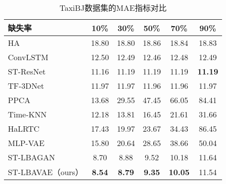\begin{table}[htbp] 
\caption{TaxiBJ数据集的MAE指标对比} \label{mae_taxibj}
\vspace{0.5em}\centering\wuhao
\begin{tabular*}{\hsize}{@{}@{\extracolsep{\fill}}lccccc@{}}
\toprule[1.5pt]
缺失率 & 10\% & 30\% & 50\% & 70\% & 90\%\\
\midrule[1pt]
HA        & 18.80  & 18.80   & 18.86   & 18.84   & 18.83          \\
ConvLSTM  & 12.50  & 12.49   & 12.46   & 12.48   & 12.49          \\
ST-ResNet & 11.16  & 11.19   & 11.19   & 11.19   & \textbf{11.19} \\
TF-3DNet  & 11.97  & 11.97   & 11.96   & 11.96   & 11.97          \\
PPCA      & 13.68  & 29.55   & 47.45   & 66.05   & 84.41          \\
Time-KNN  & 12.18  & 13.81   & 16.45   & 21.61   & 31.66          \\
HaLRTC    & 17.43  & 19.97   & 23.67   & 34.43   & 86.45          \\
MLP-VAE   & 15.80  & 20.64   & 28.65   & 38.66   & 50.04          \\
ST-LBAGAN    & 8.70   & 8.88    & 9.52   & 10.18   & 11.64          \\
ST-LBAVAE（ours）& \textbf{8.54} & \textbf{8.79} & \textbf{9.35} & \textbf{10.05} & 11.54  \\
\bottomrule[1.5pt]
\end{tabular*}
\end{table}



